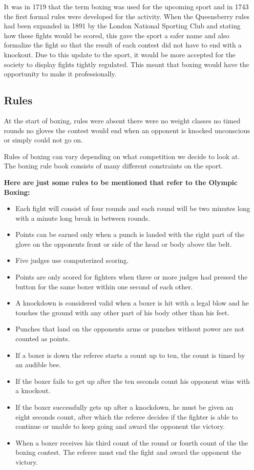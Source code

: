 \documentclass[a4paper,12pt]{report}
\begin{document}
It was in 1719 that the term boxing was used for the upcoming sport and in 1743 the first formal rules were developed for the activity. When the Queensberry rules had been expanded in 1891 by the London National Sporting Club and stating how these fights would be scored, this gave the sport a safer name and also formalize the fight so that the result of each contest did not have to end with a knockout.\cite{modernBoxing}
Due to this update to the sport, it would be more accepted for the society to display fights tightly regulated. This meant that boxing would have the opportunity to make it professionally.  

\subsection{Rules}
At the start of boxing, rules were absent there were no weight classes no timed rounds no gloves the contest would end when an opponent is knocked unconscious or simply could not go on.

Rules of boxing can vary depending on what competition we decide to look at. The boxing rule book consists of many different constraints on the sport.

\textbf{Here are just some rules to be mentioned that refer to the Olympic Boxing:}
\begin{itemize}
    \item Each fight will consist of four rounds and each round will be two minutes long with a minute long break in between rounds.
    \item Points can be earned only when a punch is landed with the right part of the glove on the opponents front or side of the head or body above the belt.
    \item Five judges use computerized scoring.
    \item Points are only scored for fighters when three or more judges had pressed the button for the same boxer within one second of each other.
    \item A knockdown is considered valid when a boxer is hit with a legal blow and he touches the ground with any other part of his body other than his feet.
    \item Punches  that land on the opponents arms or punches without power are not counted as points.
    \item If a boxer is down the referee starts a count up to ten, the count is timed by an audible bee.
    \item If the boxer fails to get up after the ten seconds count his opponent wins with a knockout.
    \item If the boxer successfully gets up after a knockdown, he must be given an eight seconds count, after which the referee decides if the fighter is able to continue or unable to keep going and award the opponent the victory.
    \item When a boxer receives his third count of the round or fourth count of the the boxing contest. The referee must end the fight and award the opponent the victory.
    \cite{lewandowski2012olympic}\\
\end{itemize}
\end{document}
